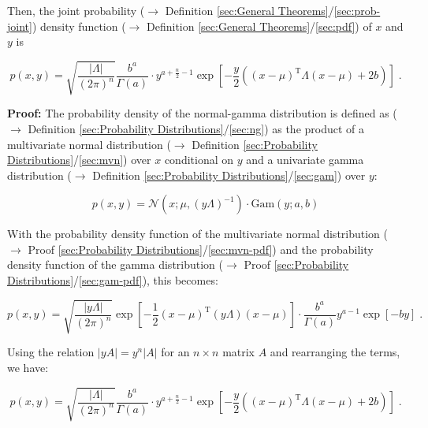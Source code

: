 \documentclass[a4paper,12pt,twoside]{book}
\begin{document}
Then, the joint probability ($\rightarrow$ Definition \ref{sec:General Theorems}/\ref{sec:prob-joint}) density function ($\rightarrow$ Definition \ref{sec:General Theorems}/\ref{sec:pdf}) of $x$ and $y$ is

\begin{equation} \label{eq:ng-pdf-ng-pdf}
p(x,y) = \sqrt{\frac{|\Lambda|}{(2 \pi)^n}} \frac{b^a}{\Gamma(a)} \cdot y^{a+\frac{n}{2}-1} \exp \left[ -\frac{y}{2} \left( (x-\mu)^\mathrm{T} \Lambda (x-\mu) + 2b \right) \right] \; .
\end{equation}


\vspace{1em}
\textbf{Proof:} The probability density of the normal-gamma distribution is defined as ($\rightarrow$ Definition \ref{sec:Probability Distributions}/\ref{sec:ng}) as the product of a multivariate normal distribution ($\rightarrow$ Definition \ref{sec:Probability Distributions}/\ref{sec:mvn}) over $x$ conditional on $y$ and a univariate gamma distribution ($\rightarrow$ Definition \ref{sec:Probability Distributions}/\ref{sec:gam}) over $y$:

\begin{equation} \label{eq:ng-pdf-ng-pdf-w1}
p(x,y) = \mathcal{N}(x; \mu, (y \Lambda)^{-1}) \cdot \mathrm{Gam}(y; a, b)
\end{equation}

With the probability density function of the multivariate normal distribution ($\rightarrow$ Proof \ref{sec:Probability Distributions}/\ref{sec:mvn-pdf}) and the probability density function of the gamma distribution ($\rightarrow$ Proof \ref{sec:Probability Distributions}/\ref{sec:gam-pdf}), this becomes:

\begin{equation} \label{eq:ng-pdf-ng-pdf-s2}
p(x,y) = \sqrt{\frac{|y \Lambda|}{(2 \pi)^n}} \exp \left[ -\frac{1}{2} (x-\mu)^\mathrm{T} (y \Lambda) (x-\mu) \right] \cdot \frac{b^a}{\Gamma(a)} y^{a-1} \exp\left[-by\right] \; .
\end{equation}

Using the relation $\lvert y A \rvert = y^n \lvert A \rvert$ for an $n \times n$ matrix $A$ and rearranging the terms, we have:

\begin{equation} \label{eq:ng-pdf-ng-pdf-qed}
p(x,y) = \sqrt{\frac{|\Lambda|}{(2 \pi)^n}} \frac{b^a}{\Gamma(a)} \cdot y^{a+\frac{n}{2}-1} \exp \left[ -\frac{y}{2} \left( (x-\mu)^\mathrm{T} \Lambda (x-\mu) + 2b \right) \right] \; .
\end{equation}
\end{document}
